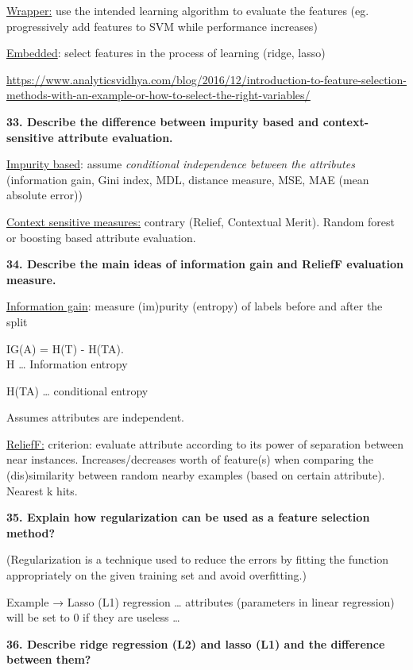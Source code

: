 \underline{Wrapper:} use the intended learning algorithm to evaluate the
features (eg. progressively add features to SVM while performance
increases)

\underline{Embedded}: select features in the process of learning (ridge,
lasso)

\href{https://www.analyticsvidhya.com/blog/2016/12/introduction-to-feature-selection-methods-with-an-example-or-how-to-select-the-right-variables/}{\underline{https://www.analyticsvidhya.com/blog/2016/12/introduction-to-feature-selection-methods-with-an-example-or-how-to-select-the-right-variables/}}

\textbf{33. Describe the difference between impurity based and
context-sensitive attribute evaluation.}

\underline{Impurity based}: assume \emph{conditional independence
between the attributes} (information gain, Gini index, MDL, distance
measure, MSE, MAE (mean absolute error))

\underline{Context sensitive measures:} contrary (Relief, Contextual
Merit). Random forest or boosting based attribute evaluation.

\textbf{34. Describe the main ideas of information gain and ReliefF
evaluation measure.}

\underline{Information gain}: measure (im)purity (entropy) of labels
before and after the split

IG(A) = H(T) - H(T\textbar A).\\
H \ldots{} Information entropy

H(T\textbar A) \ldots{} conditional entropy

Assumes attributes are independent.

\underline{ReliefF:} criterion: evaluate attribute according to its
power of separation between near instances. Increases/decreases worth of
feature(s) when comparing the (dis)similarity between random nearby
examples (based on certain attribute). Nearest k hits.

\textbf{35. Explain how regularization can be used as a feature
selection method?}

(Regularization is a technique used to reduce the errors by fitting the
function appropriately on the given training set and avoid overfitting.)

Example → Lasso (L1) regression \ldots{} attributes (parameters in
linear regression) will be set to 0 if they are useless \ldots{}

\textbf{36. Describe ridge regression (L2) and lasso (L1) and the
difference between them?}

